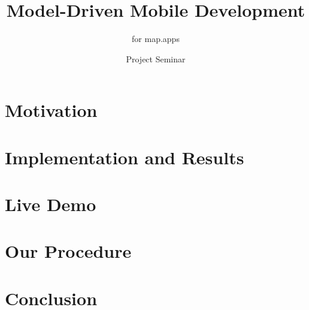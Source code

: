 \documentclass{beamer}
\author{Project Seminar \MD}
\title{Model-Driven Mobile Development}
\subtitle{\MD for map.apps}
\begin{document}
	\begin{frame}[plain]
	  \maketitle
	\end{frame}
    
    \section{Motivation}
    
    
    \section[Results]{Implementation and Results}
    
    
    \section{Live Demo}
    
    
    \section[Procedure]{Our Procedure}
    
    
    \section{Conclusion}
    
\end{document}
